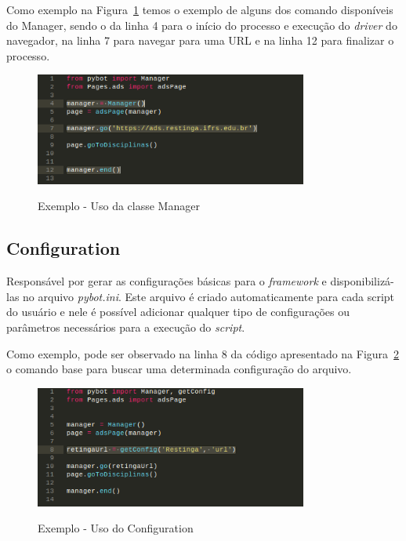         Como exemplo na Figura~\ref{fig:manager} temos o exemplo de alguns dos comando disponíveis do Manager, sendo o da linha 4 para o início do processo
        e execução do \textit{driver} do navegador, na linha 7 para navegar para uma URL e na linha 12 para finalizar o processo.

        \begin{figure}[H]
            \vspace*{0,3cm}
            \centering
            \caption{Exemplo - Uso da classe Manager}
            \includegraphics[width=0.8\textwidth]{./04-figuras/manager}
            \label{fig:manager}
        \end{figure}


        \subsection{Configuration}
        Responsável por gerar as configurações básicas para o \textit{framework} e disponibilizá-las no arquivo \textit{pybot.ini}.
        Este arquivo é criado automaticamente para cada script do usuário e nele é possível adicionar qualquer tipo de configurações ou parâmetros
        necessários para a execução do \textit{script}.

        Como exemplo, pode ser observado na linha 8 da código apresentado na Figura~\ref{fig:config} o comando base para buscar uma determinada configuração do arquivo.

        \begin{figure}[H]
            \vspace*{0,3cm}
            \centering
            \caption{Exemplo - Uso do Configuration}
            \includegraphics[width=0.8\textwidth]{./04-figuras/config}
            \label{fig:config}
        \end{figure}



